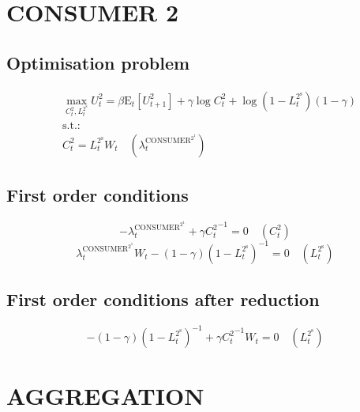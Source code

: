 \section{CONSUMER 2}

\subsection{Optimisation problem}

\begin{align}
&\max_{C^{\mathrm{2}}_{t}, L^{\mathrm{2}^{\mathrm{s}}}_{t}
} U^{\mathrm{2}}_{t} = {\beta} {\mathrm{E}_{t}\left[U^{\mathrm{2}}_{t+1}\right]} + {\gamma} {\log{C^{\mathrm{2}}_{t}}} + {\log\left(1 - L^{\mathrm{2}^{\mathrm{s}}}_{t}\right)} \left(1 - \gamma\right)\\
&\mathrm{s.t.:}\nonumber\\
& C^{\mathrm{2}}_{t} = {L^{\mathrm{2}^{\mathrm{s}}}_{t}} {W_{t}} \quad \left(\lambda^{\mathrm{CONSUMER}^{\mathrm{2}^{\mathrm{1}}}}_{t}\right)
\end{align}


\subsection{First order conditions}

\begin{equation}
-\lambda^{\mathrm{CONSUMER}^{\mathrm{2}^{\mathrm{1}}}}_{t} + {\gamma} {C^{\mathrm{2}}_{t}}^{-1} = 0
 \quad \left(C^{\mathrm{2}}_{t}\right)
\end{equation}
\begin{equation}
{\lambda^{\mathrm{CONSUMER}^{\mathrm{2}^{\mathrm{1}}}}_{t}} {W_{t}} - \left(1 - \gamma\right) \left(1 - L^{\mathrm{2}^{\mathrm{s}}}_{t}\right)^{-1} = 0
 \quad \left(L^{\mathrm{2}^{\mathrm{s}}}_{t}\right)
\end{equation}


\subsection{First order conditions after reduction}

\begin{equation}
-\left(1 - \gamma\right) \left(1 - L^{\mathrm{2}^{\mathrm{s}}}_{t}\right)^{-1} + {\gamma} {C^{\mathrm{2}}_{t}}^{-1} {W_{t}} = 0
 \quad \left(L^{\mathrm{2}^{\mathrm{s}}}_{t}\right)
\end{equation}




\section{AGGREGATION}

